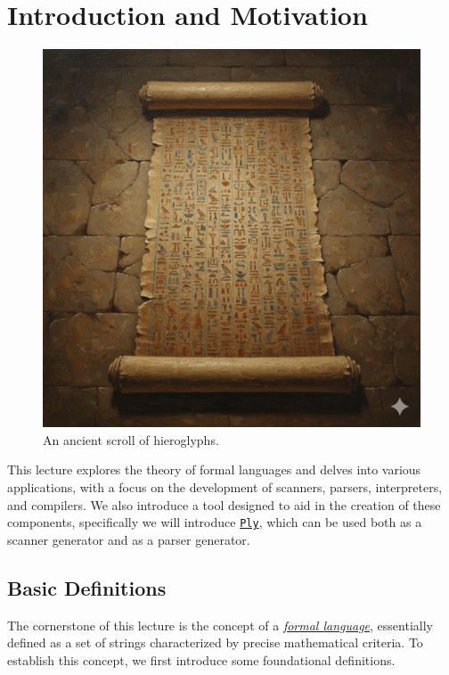 \chapter{Introduction and Motivation}

\begin{figure}[h] 
\centering
  \includegraphics[width=12.5cm]{Abbildungen/hieroglyphs.png}
\caption{An ancient scroll of hieroglyphs.}
\label{fig:hieroglyphs.png}
\end{figure}


This lecture explores the theory of formal languages and delves into various applications, with a focus on the
development of scanners, parsers, interpreters, and compilers. We also introduce a tool designed to aid in the
creation of these components, specifically we will introduce
\href{https://www.dabeaz.com/ply/ply.html}{\texttt{Ply}}, which can be used both as a scanner generator and as
a parser generator. 

\section{Basic Definitions}
The cornerstone of this lecture is the concept of a \href{http://en.wikipedia.org/wiki/Formal_language}{\emph{formal language}},  essentially defined as a set of strings characterized by precise mathematical criteria. To establish this concept, we first introduce some foundational definitions.

